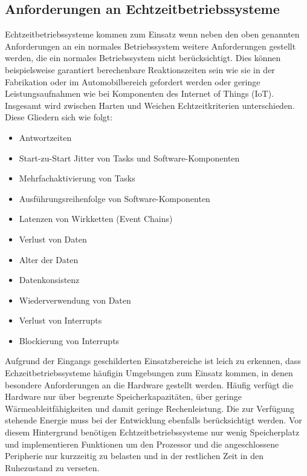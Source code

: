 \documentclass[ngerman]{seminarvorlage}
\begin{document}
\subsection{Anforderungen an Echtzeitbetriebssysteme}
Echtzeitbetriebssysteme kommen zum Einsatz wenn neben den oben genannten Anforderungen an ein normales Betriebssystem weitere Anforderungen gestellt werden, die ein normales Betriebssystem nicht berücksichtigt. Dies können beispielsweise garantiert berechenbare Reaktionszeiten sein wie sie in der Fabrikation oder im Automobilbereich gefordert werden oder geringe Leistungsaufnahmen wie bei Komponenten des Internet of Things (IoT). Insgesamt wird zwischen Harten und Weichen Echtzeitkriterien unterschieden. Diese Gliedern sich wie folgt:\newline
\begin{itemize}
	\item Antwortzeiten
	\item Start-zu-Start Jitter von Tasks und Software-Komponenten
	\item Mehrfachaktivierung von Tasks
	\item Ausführungsreihenfolge von Software-Komponenten
	\item Latenzen von Wirkketten (Event Chains)
	\item Verlust von Daten
	\item Alter der Daten
	\item Datenkonsistenz
	\item Wiederverwendung von Daten
	\item Verlust von Interrupts
	\item Blockierung von Interrupts
\end{itemize}


Aufgrund der Eingangs geschilderten Einsatzbereiche ist leich zu erkennen, dass Echzeitbetriebssysteme häufigin Umgebungen zum Einsatz kommen, in denen besondere Anforderungen an die Hardware gestellt werden. Häufig verfügt die Hardware nur über begrenzte Speicherkapazitäten, über geringe Wärmeableitfähigkeiten und damit geringe Rechenleistung. Die zur Verfügung stehende Energie muss bei der Entwicklung ebenfalls berücksichtigt werden. 
Vor diesem Hintergrund benötigen Echtzeitbetriebssysteme nur wenig Speicherplatz und implementieren Funktionen um den Prozessor und die angeschlossene Peripherie nur kurzzeitig zu belasten und in der restlichen Zeit in den Ruhezustand zu verseten.
\end{document}
